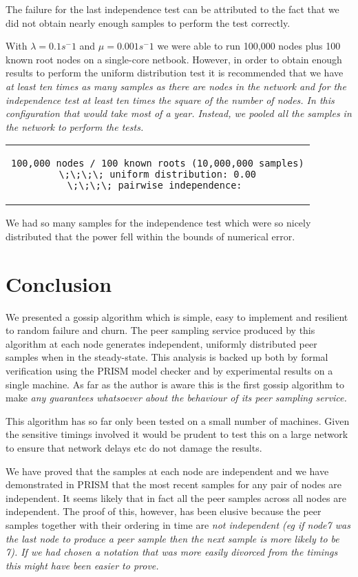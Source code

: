 \documentclass[a4paper,10pt]{article}
\newenvironment{prismprop}[0]{
  \begin{center}
  \begin{tabular}{c}
  \footnotesize
}{
  \end{tabular}
  \end{center}
}
\begin{document}
The failure for the last independence test can be attributed to the fact that we did not obtain nearly enough samples to perform the test correctly.

With $\lambda=0.1 s^-1$ and $\mu=0.001 s^-1$ we were able to run 100,000 nodes plus 100 known root nodes on a single-core netbook. However, in order to obtain enough results to perform the uniform distribution test it is recommended that we have \em at least \em ten times as many samples as there are nodes in the network and for the independence test at least ten times the \em square \em of the number of nodes. In this configuration that would take most of a year. Instead, we pooled all the samples in the network to perform the tests.

\begin{prismprop}
\begin{lstlisting}
100,000 nodes / 100 known roots (10,000,000 samples)
\;\;\;\; uniform distribution: 0.00
\;\;\;\; pairwise independence: 
\end{lstlisting}
\end{prismprop}

We had so many samples for the independence test which were so nicely distributed that the power fell within the bounds of numerical error.

\section{Conclusion}

We presented a gossip algorithm which is simple, easy to implement and resilient to random failure and churn. The peer sampling service produced by this algorithm at each node generates independent, uniformly distributed peer samples when in the steady-state. This analysis is backed up both by formal verification using the PRISM model checker and by experimental results on a single machine. As far as the author is aware this is the first gossip algorithm to make \em any \em guarantees whatsoever about the behaviour of its peer sampling service.

This algorithm has so far only been tested on a small number of machines. Given the sensitive timings involved it would be prudent to test this on a large network to ensure that network delays etc do not damage the results.

We have proved that the samples at each node are independent and we have demonstrated in PRISM that the most recent samples for any pair of nodes are independent. It seems likely that in fact all the peer samples across all nodes are independent. The proof of this, however, has been elusive because the peer samples together with their ordering in time are \em not \em independent (eg if node7 was the last node to produce a peer sample then the next sample is more likely to be 7). If we had chosen a notation that was more easily divorced from the timings this might have been easier to prove.
\end{document}
